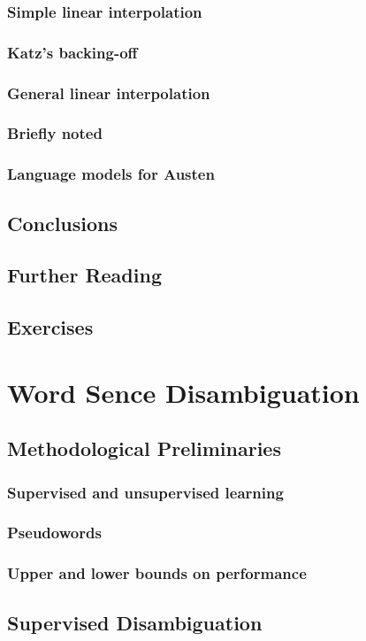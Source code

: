\documentclass[a4paper]{article}
\begin{document}
\subsubsection{Simple linear interpolation}
\subsubsection{Katz's backing-off}
\subsubsection{General linear interpolation}
\subsubsection{Briefly noted}
\subsubsection{Language models for Austen}
\subsection{Conclusions}
\subsection{Further Reading}
\subsection{Exercises}
\newpage
\section{Word Sence Disambiguation}
\subsection{Methodological Preliminaries}
\subsubsection{Supervised and unsupervised learning}
\subsubsection{Pseudowords}
\subsubsection{Upper and lower bounds on performance}
\subsection{Supervised Disambiguation}
\end{document}

